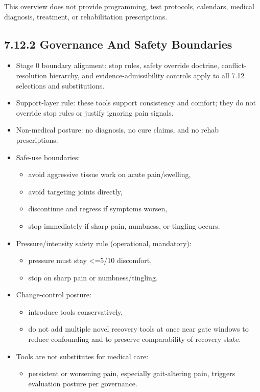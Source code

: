 \documentclass[10pt]{article}
\begin{document}
This overview does not provide programming, test protocols, calendars, medical diagnosis, treatment, or rehabilitation prescriptions.

\subsection*{7.12.2 Governance And Safety Boundaries}
{}

\begin{itemize}
\item Stage 0 boundary alignment: stop rules, safety override doctrine, conflict-resolution hierarchy, and evidence-admissibility controls apply to all 7.12 selections and substitutions.
\item Support-layer rule: these tools support consistency and comfort; they do not override stop rules or justify ignoring pain signals.
\item Non-medical posture: no diagnosis, no cure claims, and no rehab prescriptions.
\item Safe-use boundaries:
  \begin{itemize}
  \item avoid aggressive tissue work on acute pain/swelling,
  \item avoid targeting joints directly,
  \item discontinue and regress if symptoms worsen,
  \item stop immediately if sharp pain, numbness, or tingling occurs.
  \end{itemize}
\item Pressure/intensity safety rule (operational, mandatory):
  \begin{itemize}
  \item pressure must stay <=5/10 discomfort,
  \item stop on sharp pain or numbness/tingling.
  \end{itemize}
\item Change-control posture:
  \begin{itemize}
  \item introduce tools conservatively,
  \item do not add multiple novel recovery tools at once near gate windows to reduce confounding and to preserve comparability of recovery state.
  \end{itemize}
\item Tools are not substitutes for medical care:
  \begin{itemize}
  \item persistent or worsening pain, especially gait-altering pain, triggers evaluation posture per governance.
  \end{itemize}
\end{itemize}
\end{document}
